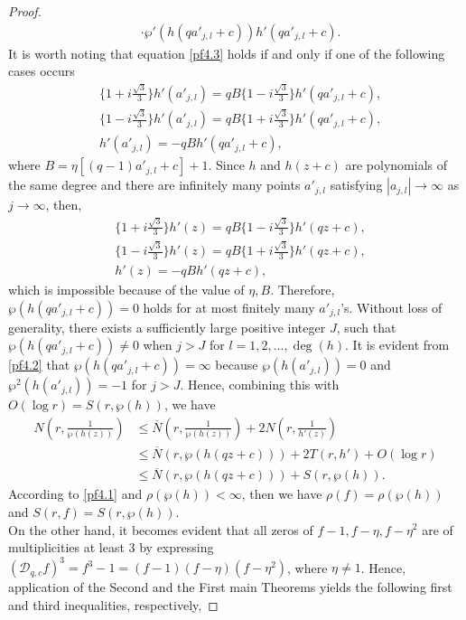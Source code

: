 \documentclass[sn-mathphys-num]{sn-jnl}%
\theoremstyle{thmstyleone}%
\theoremstyle{thmstyletwo}%
\theoremstyle{thmstylethree}%
\begin{document}
\begin{proof}
\begin{align}
		&\cdot\wp'(h(qa'_{j,l}+c))h'(qa'_{j,l}+c).\nonumber
	\end{align}
	\indent It is worth noting that equation \eqref{pf4.3} holds if and only if one of the following cases occurs
	\begin{align*}
		&\{1+i\frac{\sqrt{3}}{3}\}h'(a'_{j,l})=qB\{1-i\frac{\sqrt{3}}{3}\}h'(qa'_{j,l}+c),\\
		&\{1-i\frac{\sqrt{3}}{3}\}h'(a'_{j,l})=qB\{1+i\frac{\sqrt{3}}{3}\}h'(qa'_{j,l}+c),\\
		&h'(a'_{j,l})=-qBh'(qa'_{j,l}+c),	
	\end{align*}	
	where \(B=\eta[(q-1)a'_{j,l}+c]+1\). Since \(h\) and \(h(z+c)\) are polynomials of the same degree and there are infinitely many points \(a'_{j,l}\) satisfying \(|a_{j,l}|\to\infty\) as \(j\to\infty\), then,
	\begin{align*}
		&\{1+i\frac{\sqrt{3}}{3}\}h'(z)=qB\{1-i\frac{\sqrt{3}}{3}\}h'(qz+c),\\
		&\{1-i\frac{\sqrt{3}}{3}\}h'(z)=qB\{1+i\frac{\sqrt{3}}{3}\}h'(qz+c),\\
		&h'(z)=-qBh'(qz+c),	
	\end{align*}		
	which is impossible because of the value of \(\eta, B\). Therefore, \(\wp(h(qa'_{j,l}+c))=0\) holds for at most finitely many \(a'_{j,l}\)'s.	 Without loss of generality, there exists a sufficiently large positive integer \(J\), such that \(\wp(h(qa'_{j,l}+c))\neq0\) when \(j>J\) for \(l=1,2,...,\deg(h)\). It is evident from \eqref{pf4.2} that \(\wp(h(qa'_{j,l}+c))=\infty\) because \(\wp(h(a'_{j,l}))=0\) and \(\wp^{2}(h(a'_{j,l}))=-1\) for \(j>J\). Hence, combining this with \(O(\log r)=S(r,\wp(h))\), we have
	\begin{align}\label{pf4.4}
		N\left(r,\frac{1}{\wp(h(z))}\right)&\leq\overline{N}\left(r,\frac{1}{\wp(h(z))}\right)+2N\left(r,\frac{1}{h'(z)}\right)\nonumber\\
		&\leq\overline{N}(r,\wp(h(qz+c)))+2T(r,h')+O(\log r)\\
		&\leq\overline{N}(r,\wp(h(qz+c)))+S(r,\wp(h)).\nonumber
	\end{align}
	\indent According to \eqref{pf4.1} and \(\rho(\wp(h))<\infty\), then we have \(\rho(f)=\rho(\wp(h))\) and \(S(r,f)=S(r,\wp(h))\).	\\
	\indent On the other hand, it becomes evident that all zeros of \(f-1, f-\eta, f-\eta^{2}\) are of multiplicities at least 3 by expressing \((\mathcal{D}_{q,c}f)^{3}=f^{3}-1=(f-1)(f-\eta)(f-\eta^{2})\), where \(\eta\neq1\). Hence, application of the Second and the First main Theorems yields the following first and third inequalities, respectively,

\end{proof}
\end{document}
